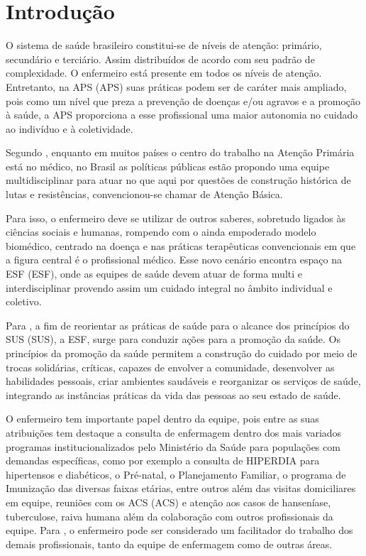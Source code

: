 \chapter{Introdução}
\label{cap:introducao}

O sistema de saúde brasileiro constitui-se de níveis de atenção: primário, secundário e terciário. Assim distribuídos de acordo com seu padrão de complexidade. O enfermeiro está presente em todos os níveis de atenção. Entretanto, na \acrshort{APS} (\acrlong{APS}) suas práticas podem ser de caráter mais ampliado, pois como um nível que preza a prevenção de doenças e/ou agravos e a promoção à saúde, a APS proporciona a esse profissional uma maior autonomia no cuidado ao indivíduo e à coletividade. 

Segundo \cite{neves2011manual}, enquanto em muitos países o centro do trabalho na Atenção Primária está no médico, no Brasil as políticas públicas estão propondo uma equipe multidisciplinar para atuar no que aqui por questões de construção histórica de lutas e resistências, convencionou-se chamar de Atenção Básica.

Para isso, o enfermeiro deve se utilizar de outros saberes, sobretudo ligados às ciências sociais e humanas, rompendo com o ainda empoderado modelo biomédico, centrado na doença e nas práticas terapêuticas convencionais em que a figura central é o profissional médico. Esse novo cenário encontra espaço na \acrshort{ESF} (\acrlong{ESF}), onde as equipes de saúde devem atuar de forma multi e interdisciplinar provendo assim um cuidado integral no âmbito individual e coletivo. 

Para \cite{guedes2007tripe}, a fim de reorientar as práticas de saúde para o alcance dos princípios do \acrshort{SUS} (\acrlong{SUS}), a \acrshort{ESF}, surge para conduzir ações para a promoção da saúde. Os princípios da promoção da saúde permitem a construção do cuidado por meio de trocas solidárias, críticas, capazes de envolver a comunidade, desenvolver as habilidades pessoais, criar ambientes saudáveis e reorganizar os serviços de saúde, integrando as instâncias práticas da vida das pessoas ao seu estado de saúde.

O enfermeiro tem importante papel dentro da equipe, pois entre as suas atribuições tem destaque a consulta de enfermagem dentro dos mais variados programas institucionalizados pelo Ministério da Saúde para populações com demandas específicas, como por exemplo a consulta de HIPERDIA para hipertensos e diabéticos, o Pré-natal, o Planejamento Familiar, o programa de Imunização das diversas faixas etárias, entre outros além das visitas domiciliares em equipe, reuniões com os \acrshort{ACS} (\acrlong{ACS}) e atenção aos casos de hanseníase, tuberculose, raiva humana  além da colaboração com outros profissionais da equipe.  Para \cite{lunardi1994enfermeiro}, o enfermeiro pode ser considerado um facilitador do trabalho dos demais profissionais, tanto da equipe de enfermagem como de outras áreas.

